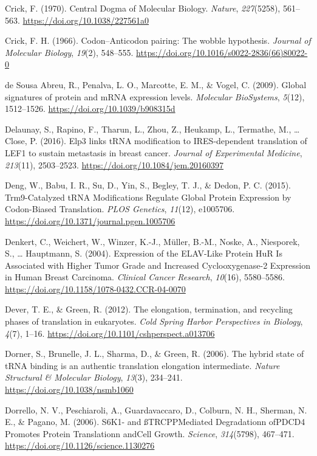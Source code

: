 \documentclass[12pt,openany]{book}
\begin{document}
\hypertarget{ref-Crick1970}{}
Crick, F. (1970). Central Dogma of Molecular Biology. \emph{Nature},
\emph{227}(5258), 561--563. \url{https://doi.org/10.1038/227561a0}

\hypertarget{ref-Crick1966}{}
Crick, F. H. (1966). Codon--Anticodon pairing: The wobble hypothesis.
\emph{Journal of Molecular Biology}, \emph{19}(2), 548--555.
\url{https://doi.org/10.1016/s0022-2836(66)80022-0}

\hypertarget{ref-deSousaAbreu2009}{}
de Sousa Abreu, R., Penalva, L. O., Marcotte, E. M., \& Vogel, C.
(2009). Global signatures of protein and mRNA expression levels.
\emph{Molecular BioSystems}, \emph{5}(12), 1512--1526.
\url{https://doi.org/10.1039/b908315d}

\hypertarget{ref-Delaunay2016}{}
Delaunay, S., Rapino, F., Tharun, L., Zhou, Z., Heukamp, L., Termathe,
M., \ldots{} Close, P. (2016). Elp3 links tRNA modification to
IRES-dependent translation of LEF1 to sustain metastasis in breast
cancer. \emph{Journal of Experimental Medicine}, \emph{213}(11),
2503--2523. \url{https://doi.org/10.1084/jem.20160397}

\hypertarget{ref-Deng2015}{}
Deng, W., Babu, I. R., Su, D., Yin, S., Begley, T. J., \& Dedon, P. C.
(2015). Trm9-Catalyzed tRNA Modifications Regulate Global Protein
Expression by Codon-Biased Translation. \emph{PLOS Genetics},
\emph{11}(12), e1005706.
\url{https://doi.org/10.1371/journal.pgen.1005706}

\hypertarget{ref-Denkert2004}{}
Denkert, C., Weichert, W., Winzer, K.-J., Müller, B.-M., Noske, A.,
Niesporek, S., \ldots{} Hauptmann, S. (2004). Expression of the
ELAV-Like Protein HuR Is Associated with Higher Tumor Grade and
Increased Cyclooxygenase-2 Expression in Human Breast Carcinoma.
\emph{Clinical Cancer Research}, \emph{10}(16), 5580--5586.
\url{https://doi.org/10.1158/1078-0432.CCR-04-0070}

\hypertarget{ref-Dever2012}{}
Dever, T. E., \& Green, R. (2012). The elongation, termination, and
recycling phases of translation in eukaryotes. \emph{Cold Spring Harbor
Perspectives in Biology}, \emph{4}(7), 1--16.
\url{https://doi.org/10.1101/cshperspect.a013706}

\hypertarget{ref-Dorner2006}{}
Dorner, S., Brunelle, J. L., Sharma, D., \& Green, R. (2006). The hybrid
state of tRNA binding is an authentic translation elongation
intermediate. \emph{Nature Structural \& Molecular Biology},
\emph{13}(3), 234--241. \url{https://doi.org/10.1038/nsmb1060}

\hypertarget{ref-Dorrello2006}{}
Dorrello, N. V., Peschiaroli, A., Guardavaccaro, D., Colburn, N. H.,
Sherman, N. E., \& Pagano, M. (2006). S6K1- and ßTRCPPMediated
Degradationn ofPDCD4 Promotes Protein Translationn andCell Growth.
\emph{Science}, \emph{314}(5798), 467--471.
\url{https://doi.org/10.1126/science.1130276}
\end{document}
